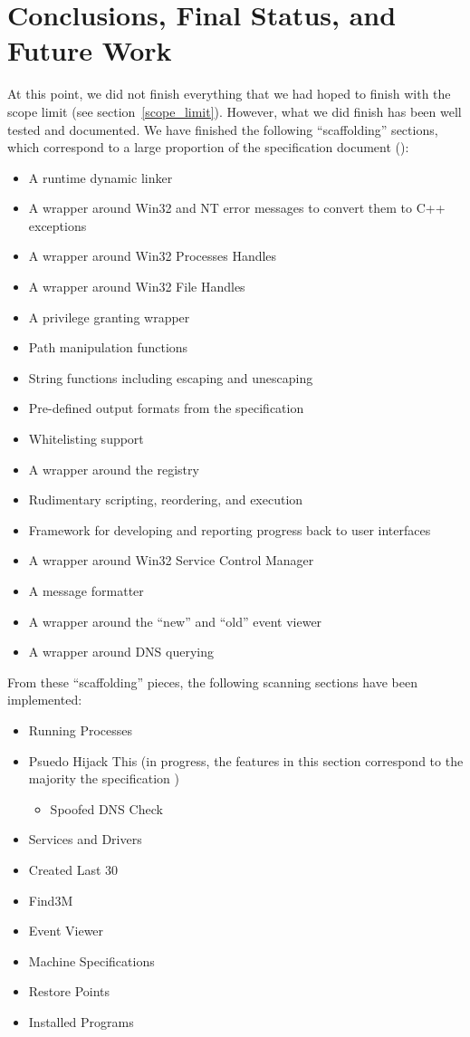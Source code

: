 \documentclass[letterpaper,12pt]{article}
\begin{document}
\newpage



\section{Conclusions, Final Status, and Future Work} \label{conclusions}
At this point, we did not finish everything that we had hoped to finish with the
scope limit (see section~\ref{scope_limit}).  However, what we did finish has
been well tested and documented.  We have finished the following ``scaffolding''
sections, which correspond to a large proportion of the specification document
(\cite{Specification}):
\begin{itemize}
  \item A runtime dynamic linker
  \item A wrapper around Win32 and NT error messages to convert them to C++
  exceptions
  \item A wrapper around Win32 Processes Handles
  \item A wrapper around Win32 File Handles
  \item A privilege granting wrapper
  \item Path manipulation functions
  \item String functions including escaping and unescaping
  \item Pre-defined output formats from the specification
  \item Whitelisting support
  \item A wrapper around the registry
  \item Rudimentary scripting, reordering, and execution
  \item Framework for developing and reporting progress back to user interfaces
  \item A wrapper around Win32 Service Control Manager 
  \item A message formatter
  \item A wrapper around the ``new'' and ``old'' event viewer
  \item A wrapper around DNS querying
\end{itemize}

From these ``scaffolding'' pieces, the following scanning sections have been
implemented:
\begin{itemize}
  \item Running Processes
  \item Psuedo Hijack This (in progress, the features in this section
  correspond to the majority the specification \cite{Specification})
\begin{itemize}
  \item Spoofed DNS Check
\end{itemize}
  \item Services and Drivers
  \item Created Last 30
  \item Find3M
  \item Event Viewer
  \item Machine Specifications
  \item Restore Points
  \item Installed Programs
\end{itemize}
\end{document}
